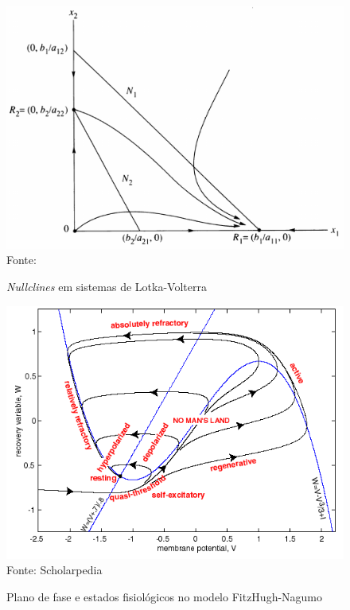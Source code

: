 \begin{figure}[htb!]
	\centering
	\caption{\textit{Nullclines} em sistemas de Lotka-Volterra}
	\label{fig:nullclineslotkavolterra}
	\includegraphics[width=0.7\linewidth]{figs/nullclines_lotka_volterra}\\
	\small{Fonte: \cite{zeeman_extinction_1995}}
\end{figure}

\begin{figure}[htb!]
	\centering
	\caption{Plano de fase e estados fisiológicos no modelo FitzHugh-Nagumo}
	\label{fig:fitzhugh}
	\includegraphics[width=0.7\linewidth]{figs/fitzhugh}\\
	\small{Fonte: Scholarpedia}
\end{figure}

